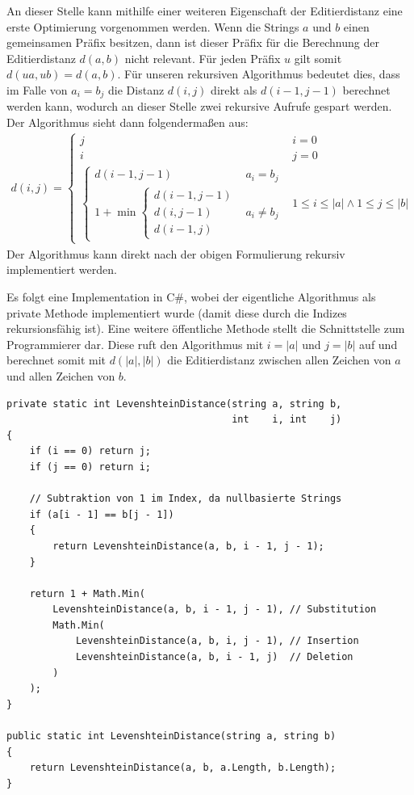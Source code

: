 \documentclass{whswinvcbook}
\begin{document}
An dieser Stelle kann mithilfe einer weiteren Eigenschaft der Editierdistanz eine erste Optimierung vorgenommen werden. Wenn die Strings $a$ und $b$ einen gemeinsamen Präfix besitzen, dann ist dieser Präfix für die Berechnung der Editierdistanz $d(a,b)$ nicht relevant. Für jeden Präfix $u$ gilt somit $d(ua,ub)=d(a,b)$. Für unseren rekursiven Algorithmus bedeutet dies, dass im Falle von $a_i=b_j$ die Distanz $d(i,j)$ direkt als $d(i-1,j-1)$ berechnet werden kann, wodurch an dieser Stelle zwei rekursive Aufrufe gespart werden. Der Algorithmus sieht dann folgendermaßen aus:
\begin{align}
    d(i,j)=\begin{cases}
        j & i=0\\
        i & j=0\\
        \begin{cases}
            d(i-1,j-1) & a_i=b_j\\
            1+\min\begin{cases}
                d(i-1,j-1)\\
                d(i,j-1)\\
                d(i-1,j)
            \end{cases} & a_i\neq b_j
        \end{cases} & 1\leq i\leq |a| \wedge 1\leq j\leq |b|
    \end{cases}
\end{align}
Der Algorithmus kann direkt nach der obigen Formulierung rekursiv implementiert werden.

Es folgt eine Implementation in C\#, wobei der eigentliche Algorithmus als private Methode implementiert wurde (damit diese durch die Indizes rekursionsfähig ist). Eine weitere öffentliche Methode stellt die Schnittstelle zum Programmierer dar. Diese ruft den Algorithmus mit $i=|a|$ und $j=|b|$ auf und berechnet somit mit $d(|a|,|b|)$ die Editierdistanz zwischen allen Zeichen von $a$ und allen Zeichen von $b$.
\begin{lstlisting}[caption=Rekursiver Algorithmus zur Berechnung der Levenshtein-Distanz, label=lst:levenshtein_recursive]
private static int LevenshteinDistance(string a, string b,
                                       int    i, int    j)
{
    if (i == 0) return j;
    if (j == 0) return i;

    // Subtraktion von 1 im Index, da nullbasierte Strings
    if (a[i - 1] == b[j - 1])
    {
        return LevenshteinDistance(a, b, i - 1, j - 1);
    }

    return 1 + Math.Min(
        LevenshteinDistance(a, b, i - 1, j - 1), // Substitution
        Math.Min(
            LevenshteinDistance(a, b, i, j - 1), // Insertion
            LevenshteinDistance(a, b, i - 1, j)  // Deletion
        )
    );
}

public static int LevenshteinDistance(string a, string b)
{
    return LevenshteinDistance(a, b, a.Length, b.Length);
}
\end{lstlisting}
\end{document}
